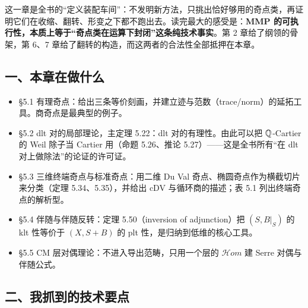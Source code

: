这一章是全书的“定义装配车间”：不发明新方法，只挑出恰好够用的奇点类，再证明它们在收缩、翻转、形变之下都不跑出去。读完最大的感受是：\textbf{MMP 的可执行性，本质上等于“奇点类在运算下封闭”这条纯技术事实}。第 2 章给了纲领的骨架，第 6、7 章给了翻转的构造，而这两者的合法性全部抵押在本章。

\subsection*{一、本章在做什么}

\begin{itemize}
\item \S5.1 有理奇点：给出三条等价刻画，并建立迹与范数（trace/norm）的延拓工具。商奇点是最典型的例子。
\item \S5.2 dlt 对的局部理论，主定理 5.22：dlt 对的有理性。由此可以把 $\mathbb{Q}$-Cartier 的 Weil 除子当 Cartier 用（命题 5.26、推论 5.27）——这是全书所有“在 dlt 对上做除法”的论证的许可证。
\item \S5.3 三维终端奇点与标准奇点：用二维 Du Val 奇点、椭圆奇点作为横截切片来分类（定理 5.34、5.35），并给出 cDV 与循环商的描述；表 5.1 列出终端奇点的解析型。
\item \S5.4 伴随与伴随反转：定理 5.50（inversion of adjunction）把 $(S,B|_S)$ 的 klt 性等价于 $(X,S+B)$ 的 plt 性，是归纳到低维的核心工具。
\item \S5.5 CM 层对偶理论：不进入导出范畴，只用一个层的 $\mathcal{H}om$ 建 Serre 对偶与伴随公式。
\end{itemize}

\subsection*{二、我抓到的技术要点}

